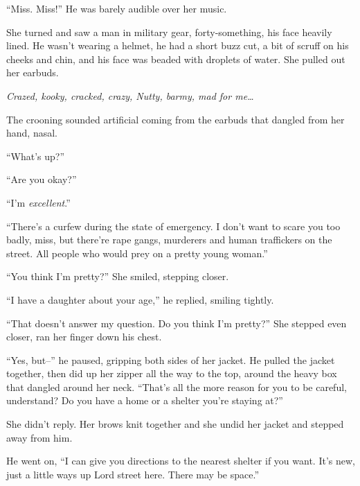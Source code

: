 ``Miss.  Miss!''  He was barely audible over her music.



She turned and saw a man in military gear, forty-something, his face heavily lined.  He wasn't wearing a helmet, he had a short buzz cut, a bit of scruff on his cheeks and chin, and his face was beaded with droplets of water.  She pulled out her earbuds.



\emph{Crazed, kooky, cracked, crazy, Nutty, barmy, mad for me\ldots}



The crooning sounded artificial coming from the earbuds that dangled from her hand, nasal.



``What's up?''



``Are you okay?''



``I'm \emph{excellent}.''



``There's a curfew during the state of emergency.  I don't want to scare you too badly, miss, but there're rape gangs, murderers and human traffickers on the street.  All people who would prey on a pretty young woman.''



``You think I'm pretty?'' She smiled, stepping closer.



``I have a daughter about your age,'' he replied, smiling tightly.



``That doesn't answer my question.  Do you think I'm pretty?''  She stepped even closer, ran her finger down his chest.



``Yes, but--'' he paused, gripping both sides of her jacket.  He pulled the jacket together, then did up her zipper all the way to the top, around the heavy box that dangled around her neck.  ``That's all the more reason for you to be careful, understand?  Do you have a home or a shelter you're staying at?''



She didn't reply.  Her brows knit together and she undid her jacket and stepped away from him.



He went on, ``I can give you directions to the nearest shelter if you want. It's new, just a little ways up Lord street here.  There may be space.''



